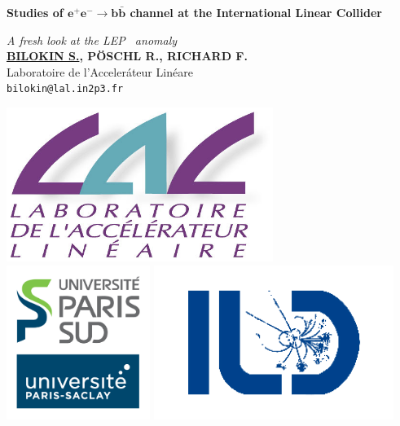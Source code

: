 \documentclass[a0,portrait]{a0poster}
\begin{document}
\BgThispage

\begin{minipage}[b]{1.\linewidth}
\veryHuge \color{NavyBlue} \textbf{Studies of $\pmb{ e^+e^-\to b\bar{b}}$ channel at the International Linear Collider} \color{Black} %
\end{minipage}
\begin{minipage}{0.5\linewidth}
\Huge\textit{A fresh look at the LEP \afb\ anomaly}\\[1cm]
\huge \textbf{\underline{BILOKIN S.}, P\"OSCHL R., RICHARD F.}\\[0.5cm] %
\huge Laboratoire de l'Acceler\'ateur Lin\'eare\\[0.4cm] %
\Large \texttt{bilokin@lal.in2p3.fr}
\end{minipage}
\begin{minipage}[b]{0.5\linewidth}
	\raggedleft
\vspace{1cm}
\includegraphics[height=5cm]{figures/LAL.jpg}
\includegraphics[height=5cm]{figures/UPSUD.jpg}
\includegraphics[height=5cm]{figures/logo-ild.png}\\
\end{minipage}

\vspace{1cm} %


\begin{multicols}{2} 

\end{multicols}
\end{document}
